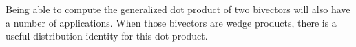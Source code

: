 %
%
Being able to compute the generalized dot product of two bivectors will also have a number of applications.
When those bivectors are wedge products, there is a useful distribution identity for this dot product.

